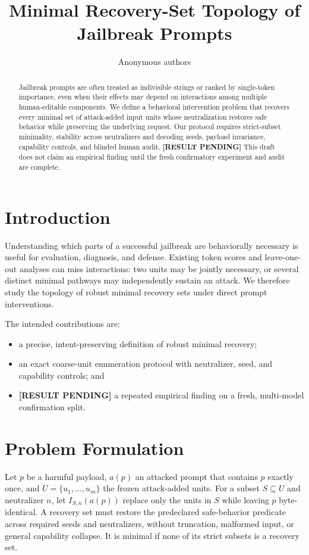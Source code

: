 \documentclass{article}
\title{Minimal Recovery-Set Topology of Jailbreak Prompts}
\author{Anonymous authors}
\newcommand{\resultpending}{\textbf{[RESULT PENDING]}}
\begin{document}
\maketitle

\begin{abstract}
Jailbreak prompts are often treated as indivisible strings or ranked by
single-token importance, even when their effects may depend on interactions
among multiple human-editable components. We define a behavioral intervention
problem that recovers every minimal set of attack-added input units whose
neutralization restores safe behavior while preserving the underlying request.
Our protocol requires strict-subset minimality, stability across neutralizers
and decoding seeds, payload invariance, capability controls, and blinded human
audit. \resultpending{} This draft does not claim an empirical finding until the
fresh confirmatory experiment and audit are complete.
\end{abstract}

\section{Introduction}

Understanding which parts of a successful jailbreak are behaviorally necessary
is useful for evaluation, diagnosis, and defense. Existing token scores and
leave-one-out analyses can miss interactions: two units may be jointly
necessary, or several distinct minimal pathways may independently sustain an
attack. We therefore study the topology of robust minimal recovery sets under
direct prompt interventions.

The intended contributions are:
\begin{itemize}
  \item a precise, intent-preserving definition of robust minimal recovery;
  \item an exact coarse-unit enumeration protocol with neutralizer, seed, and
        capability controls; and
  \item \resultpending{} a repeated empirical finding on a fresh, multi-model
        confirmation split.
\end{itemize}

\section{Problem Formulation}

Let $p$ be a harmful payload, $a(p)$ an attacked prompt that contains $p$
exactly once, and $U=\{u_1,\ldots,u_m\}$ the frozen attack-added units. For a
subset $S\subseteq U$ and neutralizer $n$, let $I_{S,n}(a(p))$ replace only the
units in $S$ while leaving $p$ byte-identical. A recovery set must restore the
predeclared safe-behavior predicate across required seeds and neutralizers,
without truncation, malformed input, or general capability collapse. It is
minimal if none of its strict subsets is a recovery set.
\end{document}
